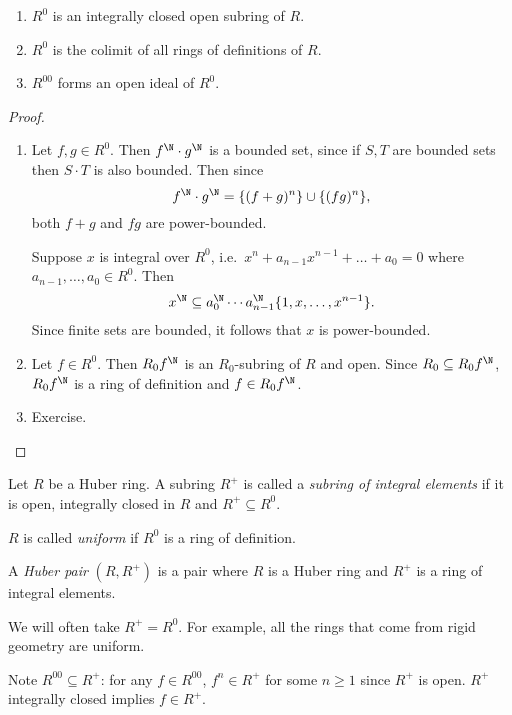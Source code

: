 \documentclass[a4paper]{article}
\begin{document}
\begin{lemma}\leavevmode
  \begin{enumerate}
  \item \(R^0\) is an integrally closed open subring of \(R\).
  \item \(R^0\) is the colimit of all rings of definitions of \(R\).
  \item \(R^{00}\) forms an open ideal of \(R^0.\)
  \end{enumerate}
\end{lemma}

\begin{proof}\leavevmode
  \begin{enumerate}
  \item Let \(f, g \in R^0\). Then \(f^\N \cdot g^\N\) is a bounded set, since if \(S, T\) are bounded sets then \(S \cdot T\) is also bounded. Then since
    \[
      f^\N \cdot g^\N = \{(f + g)^n\} \cup \{(fg)^n\},
    \]
    both \(f + g\) and \(fg\) are power-bounded.

    Suppose \(x\) is integral over \(R^0\), i.e.\ \(x^n + a_{n - 1}x^{n - 1} + \dots + a_0 = 0\) where \(a_{n - 1}, \dots, a_0 \in R^0\). Then
    \[
      x^\N \subseteq a_0^\N \cdots a_{n - 1}^\N \{1, x, \dots, x^{n - 1}\}.
    \]
    Since finite sets are bounded, it follows that \(x\) is power-bounded.
  \item Let \(f \in R^0\). Then \(R_0f^\N\) is an \(R_0\)-subring of \(R\) and open. Since \(R_0 \subseteq R_0f^\N\), \(R_0f^\N\) is a ring of definition and \(f \in R_0f^\N\).
  \item Exercise.
  \end{enumerate}
\end{proof}

\begin{definition}
  Let \(R\) be a Huber ring. A subring \(R^+\) is called a \emph{subring of integral elements} if it is open, integrally closed in \(R\) and \(R^+ \subseteq R^0\).

  \(R\) is called \emph{uniform} if \(R^0\) is a ring of definition.

  A \emph{Huber pair} \((R, R^+)\) is a pair where \(R\) is a Huber ring and \(R^+\)  is a ring of integral elements.
\end{definition}

We will often take \(R^+ = R^0\). For example, all the rings that come from rigid geometry are uniform.

Note \(R^{00} \subseteq R^+\): for any \(f \in R^{00}\), \(f^n \in R^+\) for some \(n \geq 1\) since \(R^+\) is open. \(R^+\) integrally closed implies \(f \in R^+\).
\end{document}
